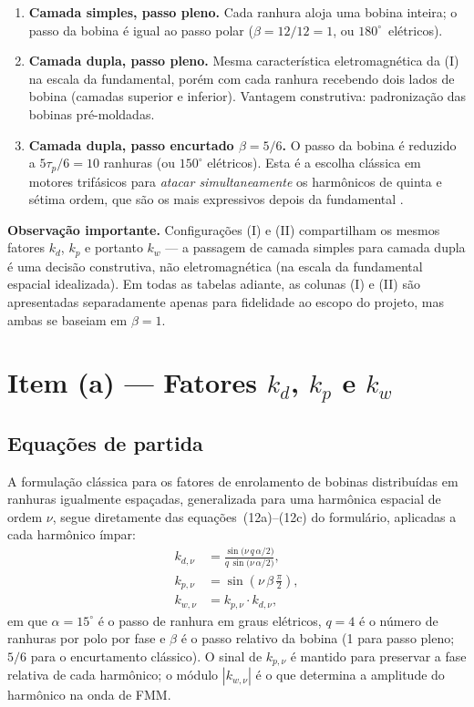 \documentclass[12pt,a4paper]{article}
\begin{document}
\begin{enumerate}
    \item[\textbf{(I)}] \textbf{Camada simples, passo pleno.}
    Cada ranhura aloja uma bobina inteira; o passo da bobina é igual ao passo polar ($\beta=12/12=1$, ou \mbox{$180^{\circ}$ elétricos}).
    
    \item[\textbf{(II)}] \textbf{Camada dupla, passo pleno.}
    Mesma característica eletromagnética da (I) na escala da fundamental, porém com cada ranhura recebendo dois lados de bobina (camadas superior e inferior). Vantagem construtiva: padronização das bobinas pré-moldadas.
    
    \item[\textbf{(III)}] \textbf{Camada dupla, passo encurtado $\beta=5/6$.}
    O passo da bobina é reduzido a $5\tau_p/6 = 10$ ranhuras (ou $150^{\circ}$ elétricos). Esta é a escolha clássica em motores trifásicos para \emph{atacar simultaneamente} os harmônicos de quinta e sétima ordem, que são os mais expressivos depois da fundamental \cite{chapman2013}.
\end{enumerate}

\noindent\textbf{Observação importante.} Configurações (I) e (II) compartilham os mesmos fatores $k_d$, $k_p$ e portanto $k_w$ --- a passagem de camada simples para camada dupla é uma decisão construtiva, não eletromagnética (na escala da fundamental espacial idealizada). Em todas as tabelas adiante, as colunas (I) e (II) são apresentadas separadamente apenas para fidelidade ao escopo do projeto, mas ambas se baseiam em $\beta=1$.

\section{Item (a) --- Fatores $k_d$, $k_p$ e $k_w$}

\subsection{Equações de partida}

A formulação clássica para os fatores de enrolamento de bobinas distribuídas em ranhuras igualmente espaçadas, generalizada para uma harmônica espacial de ordem $\nu$, segue diretamente das equações~(12a)--(12c) do formulário, aplicadas a cada harmônico ímpar:
\begin{align}
k_{d,\nu} &= \frac{\sin\!\bigl(\nu\,q\,\alpha/2\bigr)}{q\,\sin\!\bigl(\nu\,\alpha/2\bigr)}, \label{eq:kd}\\[2pt]
k_{p,\nu} &= \sin\!\left(\nu\,\beta\,\frac{\pi}{2}\right), \label{eq:kp}\\[2pt]
k_{w,\nu} &= k_{p,\nu}\cdot k_{d,\nu}, \label{eq:kw}
\end{align}
em que $\alpha=15^{\circ}$ é o passo de ranhura em graus elétricos, $q=4$ é o número de ranhuras por polo por fase e $\beta$ é o passo relativo da bobina (1 para passo pleno; $5/6$ para o encurtamento clássico). O sinal de $k_{p,\nu}$ é mantido para preservar a fase relativa de cada harmônico; o módulo $|k_{w,\nu}|$ é o que determina a amplitude do harmônico na onda de FMM.
\end{document}
